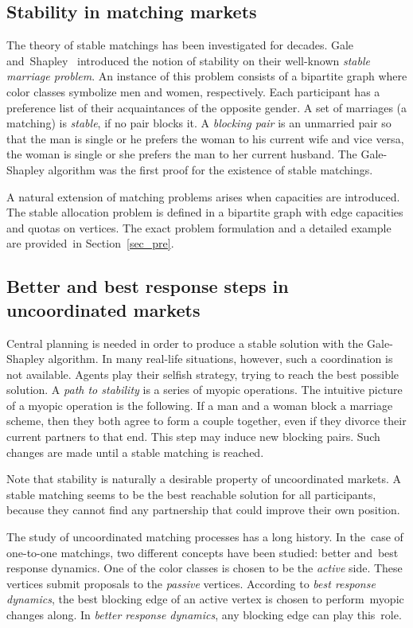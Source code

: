 \documentclass{llncs}
\begin{document}
\subsection{Stability in matching markets}

The theory of stable matchings has been investigated for decades. Gale and~Shapley~\cite{GS:1962} introduced the notion of stability on their well-known \emph{stable marriage problem}. An instance of this problem consists of a bipartite graph where color classes symbolize men and women, respectively. Each participant has a preference list of their acquaintances of the opposite gender. A set of marriages (a matching) is \emph{stable}, if no pair blocks it. A \emph{blocking pair} is an unmarried pair so that the man is single or he prefers the woman to his current wife and vice versa, the woman is single or she prefers the man to her current husband. The Gale-Shapley algorithm was the first proof for the existence of stable matchings.

A natural extension of matching problems arises when capacities are introduced. The stable allocation problem is defined in a bipartite graph with edge capacities and quotas on vertices. The exact problem formulation and a detailed example are provided~in Section~\ref{sec_pre}.

\subsection{Better and best response steps in uncoordinated markets}
\label{subsec:uncoord}

Central planning is needed in order to produce a stable solution with the Gale-Shapley algorithm. In many real-life situations, however, such a coordination is not available. Agents play their selfish strategy, trying to reach the best possible solution. A \emph{path to stability} is a series of myopic operations. The intuitive picture of a myopic operation is the following. If a man and a woman block a marriage scheme, then they both agree to form a couple together, even if they divorce their current partners to that end. This step may induce new blocking pairs. Such changes are made until a stable matching is reached. 

Note that stability is naturally a desirable property of uncoordinated markets. A stable matching seems to be the best reachable solution for all participants, because they cannot find any partnership that could improve their own position.

The study of uncoordinated matching processes has a long history. In the~case of one-to-one matchings, two different concepts have been studied: better and~best response dynamics. One of the color classes is chosen to be the \emph{active} side. These vertices submit proposals to the \emph{passive} vertices. According to \emph{best response dynamics}, the best blocking edge of an active vertex is chosen to perform~myopic changes along. In \emph{better response dynamics}, any blocking edge can play this~role. 
\end{document}

